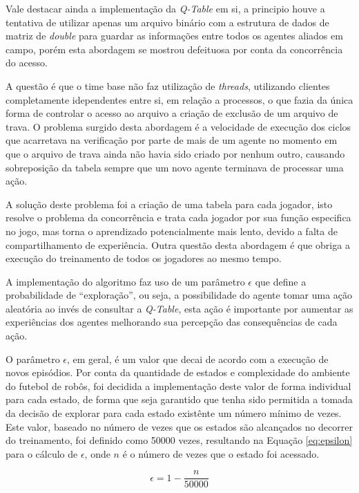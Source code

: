 Vale destacar ainda a implementação da \textit{Q-Table} em si, a principio houve
a tentativa de utilizar apenas um arquivo binário com a estrutura de dados de
matriz de \textit{double} para guardar as informações entre todos os agentes
aliados  em campo, porém esta abordagem se mostrou defeituosa por conta da
concorrência do acesso.

A questão é que o time base não faz utilização de \textit{threads}, utilizando
clientes completamente idependentes entre si, em relação a processos, o que
fazia da única forma de controlar o acesso ao arquivo a criação de exclusão de
um arquivo de trava. O problema surgido desta abordagem é a velocidade de
execução dos ciclos que acarretava na verificação por parte de mais de um agente
no momento em que o arquivo de trava ainda não havia sido criado por nenhum
outro, causando sobreposição da tabela sempre que um novo agente terminava de
processar uma ação.

A solução deste problema foi a criação de uma tabela para cada jogador, isto
resolve  o problema da concorrência e trata cada jogador por sua função
especifica no jogo, mas torna o aprendizado potencialmente mais
lento, devido a falta de compartilhamento de experiência. Outra questão desta
abordagem é que obriga a execução do treinamento de todos os jogadores ao mesmo
tempo.

A implementação do algoritmo faz uso de um parâmetro $\epsilon$ que define a probabilidade
de ``exploração'', ou seja, a possibilidade do agente tomar uma ação aleatória
ao invés de consultar a \textit{Q-Table}, esta ação é importante
por aumentar as experiências dos agentes melhorando sua percepção das
consequências de cada ação. 

O parâmetro $\epsilon$, em geral, é um valor que decai de acordo com a execução
de novos episódios. Por conta da quantidade de estados e complexidade do
ambiente do futebol de robôs, foi decidida a implementação deste valor de forma
individual para cada estado, de forma que seja garantido que tenha sido
permitida a tomada da decisão de explorar para cada estado existênte um número
mínimo de vezes. Este valor, baseado no número de vezes que os estados são
alcançados no decorrer do treinamento, foi definido como 50000 vezes, resultando
na Equação \ref{eq:epsilon} para o cálculo de $\epsilon$, onde $n$ é o número de
vezes que o estado foi acessado.

\begin{equation}
    \label{eq:epsilon}
    \epsilon=1-\frac{n}{50000}    
\end{equation}

